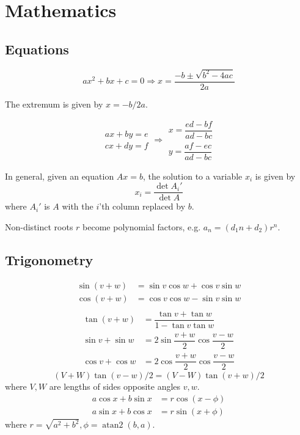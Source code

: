 
\chapter{Mathematics}

\section{Equations}
\[ax^2+bx+c=0 \Rightarrow x = \frac{-b\pm\sqrt{b^2-4ac}}{2a}\]

The extremum is given by $x = -b/2a$.

\[\begin{aligned}ax+by=e\\cx+dy=f\end{aligned}
\Rightarrow
\begin{aligned}x=\dfrac{ed-bf}{ad-bc}\\y=\dfrac{af-ec}{ad-bc}\end{aligned}\]

In general, given an equation $Ax = b$, the solution to a variable $x_i$ is given by
\[x_i = \frac{\det A_i'}{\det A} \]
where $A_i'$ is $A$ with the $i$'th column replaced by $b$.

Non-distinct roots $r$ become polynomial factors, e.g. $a_n = (d_1n + d_2)r^n$.

\section{Trigonometry}
\begin{align*}
\sin(v+w)&{}=\sin v\cos w+\cos v\sin w\\
\cos(v+w)&{}=\cos v\cos w-\sin v\sin w\\
\end{align*}
\begin{align*}
\tan(v+w)&{}=\dfrac{\tan v+\tan w}{1-\tan v\tan w}\\
\sin v+\sin w&{}=2\sin\dfrac{v+w}{2}\cos\dfrac{v-w}{2}\\
\cos v+\cos w&{}=2\cos\dfrac{v+w}{2}\cos\dfrac{v-w}{2}
\end{align*}
\[ (V+W)\tan(v-w)/2{}=(V-W)\tan(v+w)/2 \]
where $V, W$ are lengths of sides opposite angles $v, w$.
\begin{align*}
	a\cos x+b\sin x&=r\cos(x-\phi)\\
	a\sin x+b\cos x&=r\sin(x+\phi)
\end{align*}
where $r=\sqrt{a^2+b^2}, \phi=\operatorname{atan2}(b,a)$.

